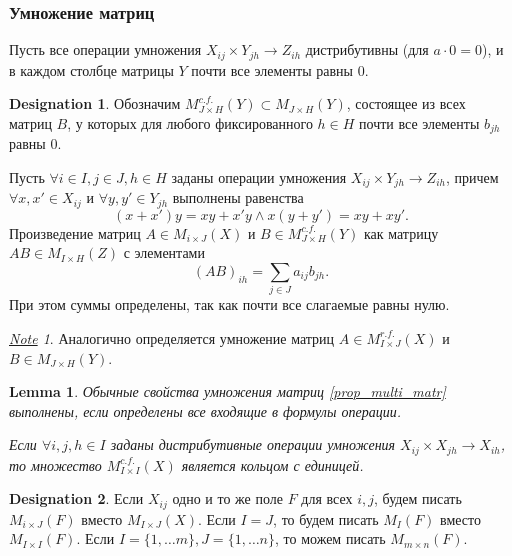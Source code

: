 \documentclass[11pt]{book}
\theoremstyle{definition}
\theoremstyle{plain}
\theoremstyle{plain}
\newtheorem{lm}{Lemma}
\theoremstyle{definition}
\newtheorem*{name}{Designation}
\theoremstyle{remark}
\newtheorem*{note}{\underline{Note}}
\begin{document}
\subsubsection{Умножение матриц}
Пусть все операции умножения  $ X_{ij}\times Y_{jh} \to Z_{ih}$ дистрибутивны (для $ a \cdot 0 = 0$), и в каждом столбце матрицы $ Y$ почти все элементы равны 0.
\begin{name}
    Обозначим $ M_{J\times H}^{c.f.}(Y) \subset M_{J\times H}(Y)$, состоящее из всех матриц $ B$, у которых для любого фиксированного  $ h \in H$ почти все элементы $ b_{jh}$ равны 0.
\end{name}
\begin{defn}
    Пусть $ \forall i \in I, j \in J, h \in H$ заданы операции умножения $ X_{ij} \times Y_{jh} \to  Z_{ih}$, причем $ \forall  x, x' \in X_{ij}$ и $ \forall y, y' \in Y_{jh}$ выполнены равенства
    \[
	(x+x')y = xy + x'y \wedge x(y + y') = xy + xy'
    .\]
    Произведение матриц $ A \in M_{i \times J}(X)$  и $ B \in M_{J\times H}^{c.f.}(Y)$ как матрицу $ AB \in M_{I \times H}(Z)$ с элементами
    \[
	(AB)_{ih} = \sum_{j \in J}a_{ij}b_{jh}
    .\]
    При этом суммы определены, так как почти все слагаемые равны нулю.
\end{defn}
\begin{note}
    Аналогично определяется умножение матриц $ A \in M_{I \times J}^{r.f.}(X)$ и $ B \in M_{J \times H}(Y)$.
\end{note}
\begin{lm}
    Обычные свойства умножения матриц \ref{prop_multi_matr} выполнены, если определены все входящие в формулы операции.

    Если $ \forall i, j, h \in I$ заданы дистрибутивные операции умножения $ X_{ij} \times X_{jh} \to  X_{ih}$, то множество $ M_{I \times I}^{c.f.}(X)$ является кольцом с единицей.
\end{lm}
\begin{name}
    Если $ X_{ij}$ одно и то же поле $ F$ для всех  $ i, j$, будем писать  $ M_{i\times J}(F)$ вместо $ M_{I\times J} (X)$. Если $ I = J$, то будем писать  $ M_{I}(F)$ вместо $ M_{I \times I}(F)$. Если $ I = \{1, \ldots m\}, J= \{1, \ldots n\}$, то можем писать $ M_{m \times n}(F)$.
\end{name}
\end{document}
